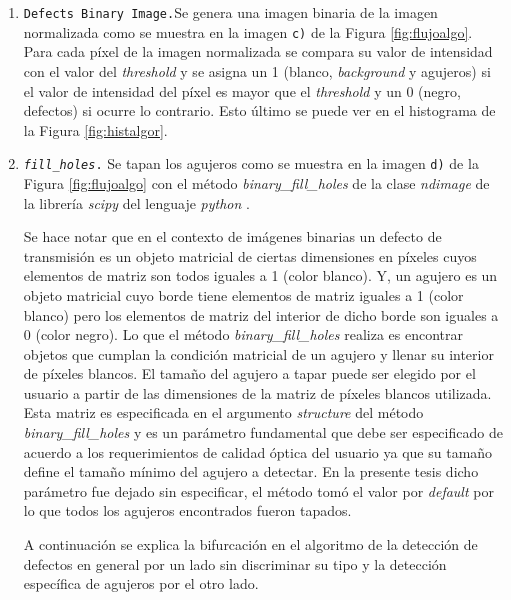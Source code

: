 \begin{enumerate}
\item \texttt{Defects Binary Image.}Se genera una imagen binaria de la imagen normalizada como se muestra en la imagen \texttt{c)} de la Figura \ref{fig:flujoalgo}. Para cada píxel de la imagen normalizada se compara su valor de intensidad con el valor del \textit{threshold} y se asigna un 1 (blanco, \textit{background} y agujeros) si el valor de intensidad del píxel es mayor que el \textit{threshold} y un 0 (negro, defectos) si ocurre lo contrario. Esto último se puede ver en el histograma de la Figura \ref{fig:histalgor}.
\item \texttt{\textit{fill\_holes}.} Se tapan los agujeros como se muestra en la imagen \texttt{d)} de la Figura \ref{fig:flujoalgo} con el método \textit{binary\_fill\_holes} de la clase \textit{ndimage} de la librería \textit{scipy} del lenguaje \textit{python} \cite{scipy}.

\hspace{0.5cm}Se hace notar que en el contexto de imágenes binarias un defecto de transmisión es un objeto matricial de ciertas dimensiones en píxeles cuyos elementos de matriz son todos iguales a 1 (color blanco). Y, un agujero es un objeto matricial cuyo borde tiene elementos de matriz iguales a 1 (color blanco) pero los elementos de matriz del interior de dicho borde son iguales a 0 (color negro). Lo que el método \textit{binary\_fill\_holes} realiza es encontrar objetos que cumplan la condición matricial de un agujero y llenar su interior de píxeles blancos. El tamaño del agujero a tapar puede ser elegido por el usuario a partir de las dimensiones de la matriz de píxeles blancos utilizada. Esta matriz es especificada en el argumento \textit{structure} del método \textit{binary\_fill\_holes} y es un parámetro fundamental que debe ser especificado de acuerdo a los requerimientos de calidad óptica del usuario ya que su tamaño define el tamaño mínimo del agujero a detectar. En la presente tesis dicho parámetro fue dejado sin especificar, el método tomó el valor por \textit{default} por lo que todos los agujeros encontrados fueron tapados.

\hspace{0.5cm}A continuación se explica la bifurcación en el algoritmo de la detección de defectos en general por un lado sin discriminar su tipo y la detección específica de agujeros por el otro lado.


\end{enumerate}
